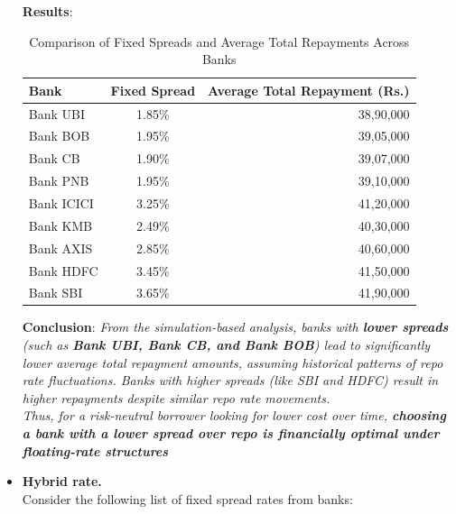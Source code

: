 \begin{itemize}
\textbf{Results}:\\
\begin{table}[h]
    \centering
    \begin{tabular}{lcr}
        \toprule
        \textbf{Bank} & \textbf{Fixed Spread} & \textbf{Average Total Repayment (Rs.)} \\
        \midrule
        Bank UBI   & 1.85\% & 38,90,000 \\
        Bank BOB   & 1.95\% & 39,05,000 \\
        Bank CB    & 1.90\% & 39,07,000 \\
        Bank PNB   & 1.95\% & 39,10,000 \\
        Bank ICICI & 3.25\% & 41,20,000 \\
        Bank KMB   & 2.49\% & 40,30,000 \\
        Bank AXIS  & 2.85\% & 40,60,000 \\
        Bank HDFC  & 3.45\% & 41,50,000 \\
        Bank SBI   & 3.65\% & 41,90,000 \\
        \bottomrule
    \end{tabular}
    \caption{Comparison of Fixed Spreads and Average Total Repayments Across Banks}
    \label{tab:results-floatingrate}
\end{table}


\textbf{Conclusion}: \textit{From the simulation-based analysis, banks with \textbf{lower spreads} (such as \textbf{Bank UBI, Bank CB, and Bank BOB}) lead to significantly lower average total repayment amounts, assuming historical patterns of repo rate fluctuations. Banks with higher spreads (like SBI and HDFC) result in higher repayments despite similar repo rate movements.
\\
Thus, for a risk-neutral borrower looking for lower cost over time, \textbf{choosing a bank with a lower spread over repo is financially optimal under floating-rate structures}}


\item 
\textbf{Hybrid rate.}\\

Consider the following list of fixed spread rates from banks:


\end{itemize}
